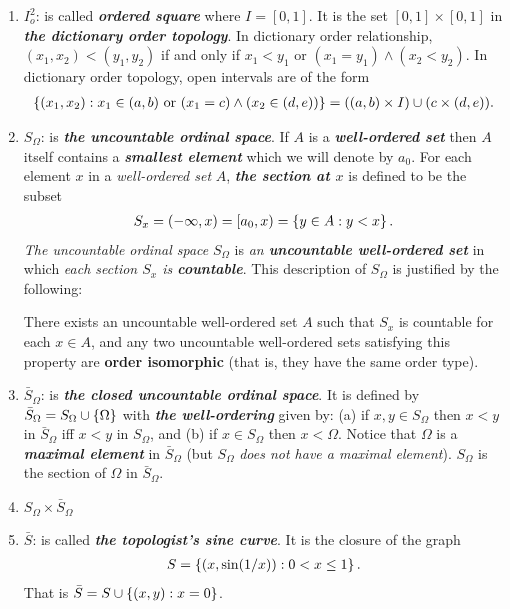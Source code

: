 \documentclass[11pt]{article}
\begin{document}
\begin{enumerate}
\item $I_o^2$: is called \emph{\textbf{ordered square}} where $I = [0,1]$. It is the set $[0,1] \times [0,1]$ in \emph{\textbf{the dictionary order topology}}. In dictionary order relationship, $(x_1, x_2) < (y_1, y_2)$ if and only if $x_1 < y_1$ or $(x_1 = y_1) \land (x_2 < y_2)$. In dictionary order topology, open intervals are of the form 
\begin{align*}
\left\{(x_1, x_2): x_1 \in (a, b) \text{ or } (x_1 = c) \land (x_2 \in (d, e))\right\} = ((a, b) \times I) \cup (c \times (d, e)).
\end{align*}

\item $S_{\Omega}$: is \emph{\textbf{the uncountable ordinal space}}. If $A$ is a \emph{\textbf{well-ordered set}} then $A$ itself contains a \emph{\textbf{smallest element}} which we will denote by $a_0$. For each element $x$ in a \emph{well-ordered set} $A$, \emph{\textbf{the section at $x$}} is defined to be the subset
\begin{align*}
S_x = (-\infty, x) = [a_0, x) = \left\{y \in A:  y < x\right\}.
\end{align*} \emph{The uncountable ordinal space} $S_{\Omega}$ is \emph{an \textbf{uncountable well-ordered set}} in which \emph{each
section $S_x$ is \textbf{countable}}. This description of $S_{\Omega}$  is justified by the following:
\begin{lemma}
There exists an uncountable well-ordered set $A$ such that $S_x$ is countable for each $x \in A$, and any two uncountable well-ordered sets satisfying this property are \textbf{order isomorphic} (that is, they have the same order type).
\end{lemma}

\item $\bar{S}_{\Omega}$:  is \emph{\textbf{the closed uncountable ordinal space}}. It is defined by $\bar{S}_{\Omega} = S_{\Omega} \cup \left\{\Omega\right\}$ with \emph{\textbf{the well-ordering}} given by: (a) if $x, y \in S_{\Omega}$ then $x < y$ in $\bar{S}_{\Omega}$ iff $x < y$ in $S_{\Omega}$, and (b) if $x \in S_{\Omega}$ then $x < \Omega$. Notice that $ \Omega$ is a \emph{\textbf{maximal element}} in $\bar{S}_{\Omega}$ (but $S_{\Omega}$ \emph{does not have a maximal element}). $S_{\Omega}$ is the section of $\Omega$ in $\bar{S}_{\Omega}$.

\item $S_{\Omega} \times \bar{S}_{\Omega}$

\item $\bar{S}$: is called  \emph{\textbf{the topologist's sine curve}}. It is the closure of the graph
\begin{align*}
S = \left\{(x, \sin(1/x)): 0 < x \le 1\right\}.
\end{align*} That is $\bar{S} = S \cup \left\{(x,y): x=0\right\}$.

\end{enumerate}
\newpage


\end{document}
